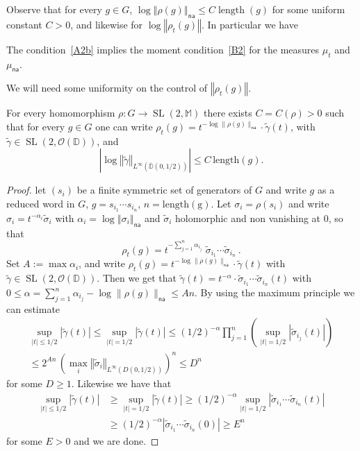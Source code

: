 \documentclass[AHL,Unicode,longabstracts]{cedram}
\DeclareMathOperator{\length}{length}
\DeclareMathOperator{\SL}{SL}
\newcommand{\cO}{\mathcal{O}}
\newcommand{\mm}{\mathbb{M}}
\newcommand{\D}{\mathbb{D}}
\newcommand{\norm}[1]{\left\Vert#1\right\Vert}
\newcommand{\abs}[1]{\left\vert#1\right\vert}
\newcommand{\lrpar}[1]{\left(#1\right)}
\newcommand{\na}{\mathsf{na}}
\begin{document}
Observe that for every $g\in G$, $\log \norm{\rho(g)}_\na\leq C \length (g)$ for some uniform constant $C>0$, and likewise for $\log\norm{\rho_t(g)}$. In particular we have

\begin{lemm}\label{lem:AtoB}
The condition~\eqref{A2b} implies the moment condition~\eqref{B2} for the measures $\mu_t$ and $\mu_\na$.
\end{lemm}

We will need some uniformity on the control of $\norm{\rho_t(g)}$.

\begin{lemm}\label{lem:uniform disk}
For every homomorphism $\rho: G\to \SL(2, \mm)$ there exists $C = C(\rho)>0$ such that for every $g\in G$ one can write $\rho_t(g) = t^{-\log\|\rho(g) \|_\na}\cdot \widetilde{\gamma}(t)$, with $\widetilde{\gamma}\in \SL(2,\cO(\D))$, and
\begin{equation}\label{eq:uniform disk}
\abs{\log\norm{\widetilde \gamma}_{L^{\infty}(\overline{\D}(0,1/2))} }\leq C\, \mathrm{length}(g).
\end{equation}
\end{lemm}

\begin{proof}
let $(s_i)$ be a finite symmetric set of generators of $G$ and write $g$ as a reduced word in $G$, $g = s_{i_1}\cdots s_{i_n}$, $n = \mathrm{length(g)}$. Let $\sigma_i = \rho(s_i)$ and write $\sigma_i = t^{-\alpha_i} \widetilde \sigma_i$ with $\alpha_i = \log\norm{\sigma_i}_\na$ and $\widetilde \sigma_i$ holomorphic and non vanishing at 0,
so that
\[
\rho_t(g)= t^{-\sum_{j=1}^n\alpha_{i_j}} \; \widetilde \sigma_{i_1}\cdots \widetilde \sigma_{i_n}~.
\]
Set $A:= \max \alpha_i$, and write $\rho_t(g) = t^{-\log\|\rho(g) \|_\na}\cdot \widetilde{\gamma}(t)$ with $\widetilde{\gamma} \in \SL(2, \cO(\D))$. Then we get that $\widetilde{\gamma}(t) = t^{-\alpha} \cdot \widetilde \sigma_{i_1}\cdots \widetilde \sigma_{i_n}(t)$ with $0\le \alpha = \sum_{j=1}^n\alpha_{i_j} - \log\|\rho(g) \|_\na \le An$. By using the maximum principle we can estimate
\begin{multline*}
\sup_{|t|\le1/2}|\widetilde{\gamma}(t)| \le \sup_{|t|=1/2} |\widetilde{\gamma}(t)| \le (1/2)^{-\alpha} \prod_{j=1}^n \lrpar {\sup_{|t|=1/2} \abs{\widetilde \sigma_{i_j}(t) }}\\
\le 2^{An} \, \left(\max_{i}\norm{ \widetilde \sigma_i}_{L^\infty(D(0, 1/2))} \right)^n\le D^n
\end{multline*}
for some $D\geq1$. Likewise we have that
\begin{align*}
\sup_{|t|\le1/2}|\widetilde{\gamma}(t)| &\ge \sup_{|t|=1/2} |\widetilde{\gamma}(t)|
\ge (1/2)^{-\alpha} \sup_{|t|=1/2} \abs{\widetilde \sigma_{i_1}\cdots \widetilde \sigma_{i_n}(t)}\\
&\ge (1/2)^{-\alpha} \abs{\widetilde \sigma_{i_1}\cdots \widetilde \sigma_{i_n}(0)} \ge E^n
\end{align*}
for some $E>0$ and we are done.
\end{proof}
\end{document}
